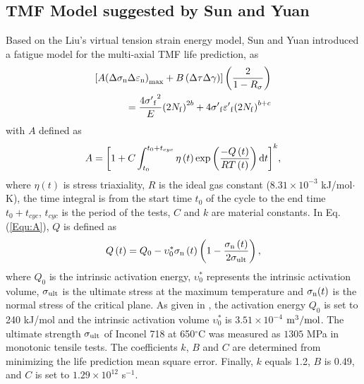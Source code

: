 \documentclass[preprint,5p,twocolumn,10pt,sort&compress]{elsarticle}
\begin{document}
\subsection{TMF Model suggested by Sun and Yuan}
Based on the Liu's virtual tension strain energy model, Sun and Yuan \cite{SUN2019228} introduced a fatigue model for the multi-axial TMF life prediction, as
\begin{equation}
\begin{aligned}
\left[ {A{{\left( {\Delta {\sigma _{\rm n}}\Delta {\varepsilon _{\rm n}}} \right)}_{\max }} + B\left( {\Delta \tau \Delta \gamma } \right)} \right]\left( {\frac{2}{{1 - {R_\sigma }}}} \right)\\
= \frac{{4{{\sigma '}_{\rm f}}^2}}{E}{\left( {2{N_{\rm f}}} \right)^{2b}} + 4{{\sigma '}_{\rm f}}{{\varepsilon '}_{\rm f}}{\left( {2{N_{\rm f}}} \right)^{b + c}}
\end{aligned}
\label{Equ:TMF_model}
\end{equation}
with $A$ defined as
\begin{equation}
A = {\left[ {1 + C\int_{{t_0}}^{{t_0} + {t_{cyc}}} {\eta \left( t \right)\exp \left( {\frac{{ - Q\left( t \right)}}{{RT\left( t \right)}}} \right){\rm{d}}t} } \right]^k},
\label{Equ:A}
\end{equation}
where $\eta \left( t \right)$ is stress triaxiality, $R$ is the ideal gas constant ($8.31\times10^{-3}$ kJ/mol$\cdot$K), the time integral is from the start time $t_0$ of the cycle to the end time $t_0 + t_{cyc}$, $t_{cyc}$ is the period of the tests, $C$ and $k$ are material constants.
In Eq. (\ref{Equ:A}), $Q$ is defined as \cite{Warren2006,Warren2008}
\begin{equation}
Q\left( t \right) = {Q_0} - \upsilon _0^*{\sigma _{\rm n}}\left( t \right)\left( {1 - \frac{{{\sigma _{\rm n}}\left( t \right)}}{{2{\sigma _{\rm ult}}}}} \right),
\label{Equ:creep_activation_energy}
\end{equation}
where $Q_0$ is the intrinsic activation energy, $\upsilon _0^*$ represents the intrinsic activation volume, $\sigma_{\rm ult}$ is the ultimate stress at the maximum temperature and $\sigma_{\rm n}(t)$ is the normal stress of the critical plane.
As given in \cite{Warren2008}, the activation energy $Q_0$ is set to 240 kJ/mol and the intrinsic activation volume $\upsilon _0^*$ is $3.51\times10^{-4}$ $\rm{m}^{3}/\rm{mol}$. The ultimate strength $\sigma_{\rm ult}$ of Inconel 718 at 650$^\circ$C was measured as $1305$ MPa in monotonic tensile tests. The coefficients $k$, $B$ and $C$ are determined from minimizing the life prediction mean square error. Finally, $k$ equals 1.2, $B$ is 0.49, and $C$ is set to $1.29\times10^{12}$ s$^{-1}$.
\end{document}

